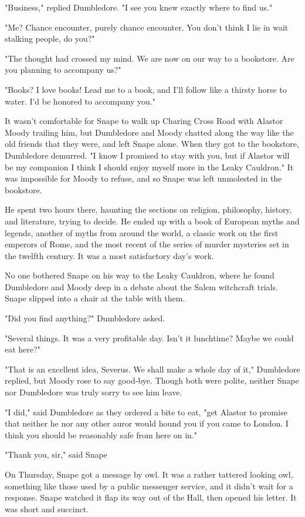 "Business," replied Dumbledore. "I see you knew exactly where to find us."

"Me? Chance encounter, purely chance encounter. You don't think I lie in wait stalking people, do you?"

"The thought had crossed my mind. We are now on our way to a bookstore. Are you planning to accompany us?"

"Books? I love books! Lead me to a book, and I'll follow like a thirsty horse to water. I'd be honored to accompany you."

It wasn't comfortable for Snape to walk up Charing Cross Road with Alastor Moody trailing him, but Dumbledore and Moody chatted along the way like the old friends that they were, and left Snape alone. When they got to the bookstore, Dumbledore demurred. "I know I promised to stay with you, but if Alastor will be my companion I think I should enjoy myself more in the Leaky Cauldron." It was impossible for Moody to refuse, and so Snape was left unmolested in the bookstore.

He spent two hours there, haunting the sections on religion, philosophy, history, and literature, trying to decide. He ended up with a book of European myths and legends, another of myths from around the world, a classic work on the first emperors of Rome, and the most recent of the series of murder mysteries set in the twelfth century. It was a most satisfactory day's work.

No one bothered Snape on his way to the Leaky Cauldron, where he found Dumbledore and Moody deep in a debate about the Salem witchcraft trials. Snape slipped into a chair at the table with them.

"Did you find anything?" Dumbledore asked.

"Several things. It was a very profitable day. Isn't it lunchtime? Maybe we could eat here?"

"That is an excellent idea, Severus. We shall make a whole day of it," Dumbledore replied, but Moody rose to say good-bye. Though both were polite, neither Snape nor Dumbledore was truly sorry to see him leave.

"I did," said Dumbledore as they ordered a bite to eat, "get Alastor to promise that neither he nor any other auror would hound you if you came to London. I think you should be reasonably safe from here on in."

"Thank you, sir," said Snape

On Thursday, Snape got a message by owl. It was a rather tattered looking owl, something like those used by a public messenger service, and it didn't wait for a response. Snape watched it flap its way out of the Hall, then opened his letter. It was short and succinct.

